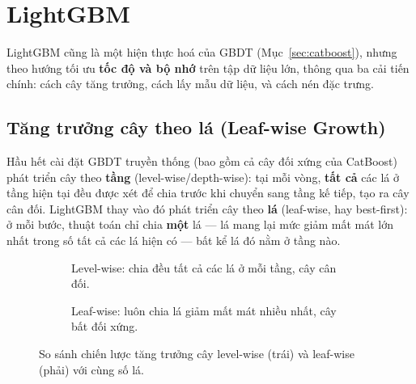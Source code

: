 \documentclass[a4paper]{article}
\begin{document}
\section{LightGBM}

LightGBM cũng là một hiện thực hoá của GBDT (Mục~\ref{sec:catboost}), nhưng
theo hướng tối ưu \textbf{tốc độ và bộ nhớ} trên tập dữ liệu lớn, thông qua ba
cải tiến chính: cách cây tăng trưởng, cách lấy mẫu dữ liệu, và cách nén đặc
trưng.

\subsection{Tăng trưởng cây theo lá (Leaf-wise Growth)}

Hầu hết cài đặt GBDT truyền thống (bao gồm cả cây đối xứng của CatBoost) phát
triển cây theo \textbf{tầng} (level-wise/depth-wise): tại mỗi vòng, \textbf{tất
cả} các lá ở tầng hiện tại đều được xét để chia trước khi chuyển sang tầng kế
tiếp, tạo ra cây cân đối. LightGBM thay vào đó phát triển cây theo
\textbf{lá} (leaf-wise, hay best-first): ở mỗi bước, thuật toán chỉ chia
\textbf{một} lá --- lá mang lại mức giảm mất mát lớn nhất trong số tất cả các
lá hiện có --- bất kể lá đó nằm ở tầng nào.

\begin{figure}[H]
  \centering
  \begin{subfigure}[b]{0.47\textwidth}
    \centering
    \caption{Level-wise: chia đều tất cả các lá ở mỗi tầng, cây cân đối.}
  \end{subfigure}
  \hfill
  \begin{subfigure}[b]{0.47\textwidth}
    \centering
    \caption{Leaf-wise: luôn chia lá giảm mất mát nhiều nhất, cây bất đối
    xứng.}
  \end{subfigure}
  \caption{So sánh chiến lược tăng trưởng cây level-wise (trái) và leaf-wise
  (phải) với cùng số lá.}
  \label{fig:growth}
\end{figure}
\end{document}
